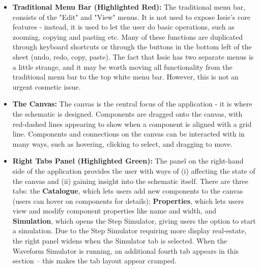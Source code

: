 \begin{itemize}
    \item[] \textbf{Traditional Menu Bar (Highlighted Red):} The traditional menu bar, consists of the "Edit" and "View" menus. It is not used to expose Issie's core features - instead, it is used to let the user do basic operations, such as zooming, copying and pasting etc. Many of these functions are duplicated through keyboard shortcuts or through the buttons in the bottom left of the sheet (undo, redo, copy, paste). The fact that Issie has two separate menus is a little strange, and it may be worth moving all functionality from the traditional menu bar to the top white menu bar. However, this is not an urgent cosmetic issue.
    \item[] \textbf{The Canvas:} The canvas is the central focus of the application - it is where the schematic is designed. Components are dragged onto the canvas, with red-dashed lines appearing to show when a component is aligned with a grid line. Components and connections on the canvas can be interacted with in many ways, such as hovering, clicking to select, and dragging to move.
    \item[] \textbf{Right Tabs Panel (Highlighted Green):} The panel on the right-hand side of the application provides the user with ways of (i) affecting the state of the canvas and (ii) gaining insight into the schematic itself. There are three tabs: the \textbf{Catalogue}, which lets users add new components to the canvas (users can hover on components for details); \textbf{Properties}, which lets users view and modify component properties like name and width, and \textbf{Simulation}, which opens the Step Simulator, giving users the option to start a simulation. Due to the Step Simulator requiring more display real-estate, the right panel widens when the Simulator tab is selected. When the Waveform Simulator is running, an additional fourth tab  appears in this section -- this makes the tab layout appear cramped.

\end{itemize}
